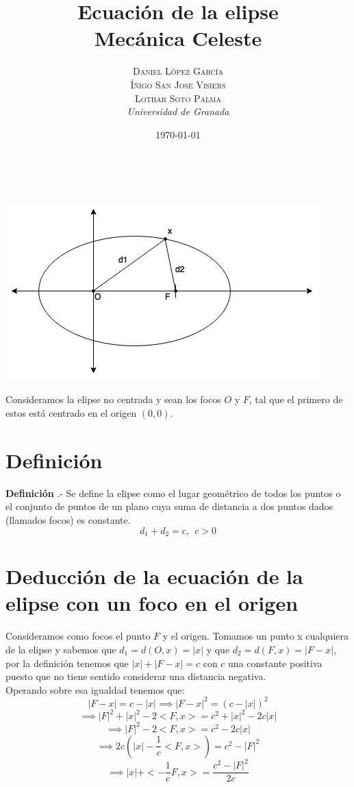 \documentclass[a4paper, 11pt]{article} %
\title{\textbf{Ecuación de la elipse}\\ %
\vspace{20 pt}
Mecánica Celeste} %
\author{\textsc{Daniel López García\\
Íñigo San Jose Visiers\\
Lothar Soto Palma} %
\\{\textit{Universidad de Granada}}} %
\date{\today} %
\makeatletter
\renewcommand{\maketitle}{ %
\begin{center} %
{\Huge\@title} %
\end{center}

\vspace{20pt} %

\begin{flushright} %
{\large\@author} %
\\\@date %

\vspace{40pt} %
\end{flushright}
\renewcommand{\baselinestretch}{0.5}

}
\newcounter{ndef}
\makeatother
\begin{document}
	\maketitle
	\begin{center}
		\includegraphics[scale=0.75]{elipse.png} 
	\end{center}	\addtocounter{ndef}{1}
	Consideramos la elipse no centrada y sean los focos $O$ y $F$, tal que el primero de estos está centrado en el origen $(0,0)$.\\ 
	\section{Definición}
	\textbf{Definición }.- Se define la elipse como el lugar geométrico de todos los puntos o el conjunto de puntos de un plano cuya suma de distancia a dos puntos dados (llamados focos) es constante.\\
	$$d_1+d_2 = c, \ \ c>0$$
	\section{Deducción de la ecuación de la elipse con un foco en el origen}
	Consideramos como focos el punto $F$ y el origen. Tomamos un punto x cualquiera de la elipse y sabemos que $d_1 = d(O,x) = |x|$ y que $d_2 = d(F,x) = |F-x|$, por la definición tenemos que $|x|+|F-x|=c$ con $c$ una constante positiva puesto que no tiene sentido considerar una distancia negativa.\\
	Operando sobre esa igualdad tenemos que:\\
	$$|F-x|= c - |x| \implies {|F-x|}^2 = {(c-|x|)}^2 $$ 
	$$\implies  |F|^2+|x|^2-2<F,x> = c^2+|x|^2-2c|x| $$
	$$\implies |F|^2-2<F,x>= c^2 -2c|x| $$
	$$\implies 2c(|x|-\frac{1}{c}<F,x>)= c^2 - |F|^2$$
	$$\implies |x|+<-\frac{1}{c}F,x> = \frac{c^2-|F|^2}{2c}$$
	
\end{document}
